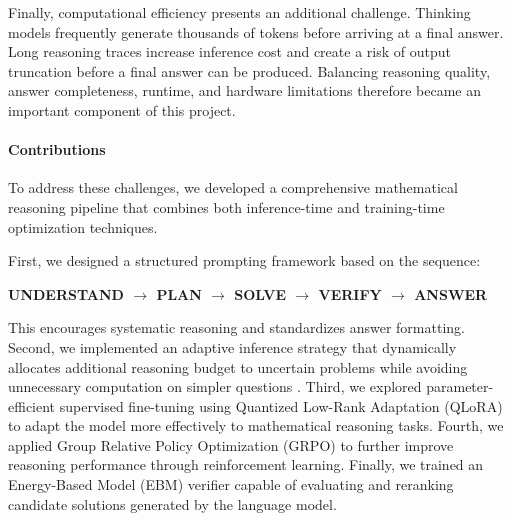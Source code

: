 \documentclass{article}
\begin{document}
Finally, computational efficiency presents an additional challenge. Thinking models frequently generate thousands of tokens before arriving at a final answer. Long reasoning traces increase inference cost and create a risk of output truncation before a final answer can be produced. Balancing reasoning quality, answer completeness, runtime, and hardware limitations therefore became an important component of this project.


\paragraph{Contributions}
To address these challenges, we developed a comprehensive mathematical reasoning pipeline that combines both inference-time and training-time optimization techniques.

First, we designed a structured prompting framework based on the sequence:
\begin{center}
    \textbf{UNDERSTAND $\rightarrow$ PLAN $\rightarrow$ SOLVE $\rightarrow$ VERIFY $\rightarrow$ ANSWER}
\end{center}
This encourages systematic reasoning and standardizes answer formatting. Second, we implemented an adaptive inference strategy that dynamically allocates additional reasoning budget to uncertain problems while avoiding unnecessary computation on simpler questions \cite{snell2024scaling}. Third, we explored parameter-efficient supervised fine-tuning using Quantized Low-Rank Adaptation (QLoRA) \cite{dettmers2023qlora} to adapt the model more effectively to mathematical reasoning tasks. Fourth, we applied Group Relative Policy Optimization (GRPO) \cite{shao2024grpo} to further improve reasoning performance through reinforcement learning. Finally, we trained an Energy-Based Model (EBM) verifier \cite{lightman2023verify} capable of evaluating and reranking candidate solutions generated by the language model.
\end{document}
